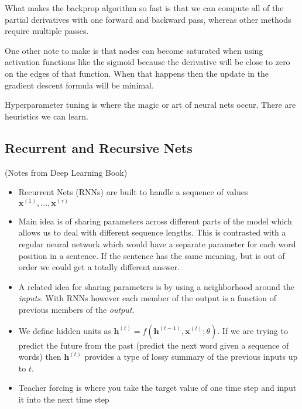 What makes the backprop algorithm so fast is that we can compute all of the partial derivatives with one forward and backward pass, whereas other methods require multiple passes. 
 
One other note to make is that nodes can become saturated when using activation functions like the sigmoid because the derivative will be close to zero on the edges of that function. When that happens then the update in the gradient descent formula will be minimal.

Hyperparameter tuning is where the magic or art of neural nets occur. There are heuristics we can learn.

 
 
 
 \subsection{Recurrent and Recursive Nets}
 
(Notes from Deep Learning Book)

\begin{itemize}
\item Recurrent Nets (RNNs) are built to handle a sequence of values $\mathbf{x}^{(1)},..., \mathbf{x}^{(\tau)}$
\item Main idea is of sharing parameters across different parts of the model which allows us to deal with different sequence lengths. This is contrasted with a regular neural network which would have a separate parameter for each word position in a sentence. If the sentence has the same meaning, but is out of order we could get a totally different answer.
\item A related idea for sharing parameters is by using a neighborhood around the \emph{inputs}. With RNNs however each member of the output is a function of previous members of the \emph{output}.
\item We define hidden units as $\mathbf{h}^{(t)} = f(\mathbf{h}^{(t-1)}, \mathbf{x}^{(t)}; \theta)$. If we are trying to predict the future from the past (predict the next word given a sequence of words) then $\mathbf{h}^{(t)}$ provides a type of lossy summary of the previous inputs up to $t$. 

\item Teacher forcing is where you take the target value of one time step and input it into the next time step

\end{itemize}
 